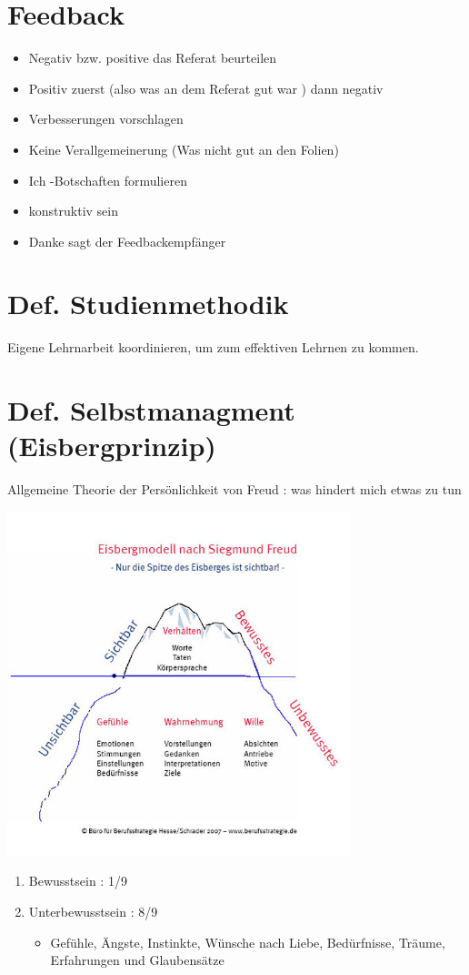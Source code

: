 \documentclass[11pt,a4paper]{article}
\begin{document}
\section*{Feedback}
\begin{itemize}
\item Negativ bzw. positive das Referat beurteilen
\item Positiv zuerst (also was an dem Referat gut war ) dann negativ
\item Verbesserungen vorschlagen
\item Keine Verallgemeinerung (Was nicht gut an den Folien)
\item Ich -Botschaften formulieren 
\item konstruktiv sein
\item Danke sagt der Feedbackempfänger
\end{itemize}

\section*{Def. Studienmethodik}
  Eigene Lehrnarbeit koordinieren, um zum effektiven Lehrnen zu kommen. 
 \section*{Def. Selbstmanagment (Eisbergprinzip)}
Allgemeine Theorie der Persönlichkeit von  Freud  : was hindert mich etwas zu tun  
 
  	 \includegraphics[width=100mm]{Eisbergprinzip}
  	 \begin{enumerate}
  	 \item Bewusstsein : 1/9 
  	 \item Unterbewusstsein : 8/9 \begin{itemize}
  	 \item Gefühle, Ängste, Instinkte, Wünsche nach Liebe, Bedürfnisse, Träume, Erfahrungen und Glaubensätze 
  	 \end{itemize}
  	 
  	 \end{enumerate}
\end{document}

